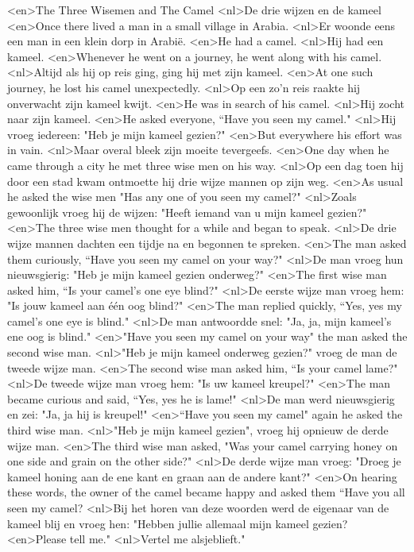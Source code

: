 <en>The Three Wisemen and The Camel
<nl>De drie wijzen en de kameel
<en>Once there lived a man in a small village in Arabia.
<nl>Er woonde eens een man in een klein dorp in Arabië.
<en>He had a camel.
<nl>Hij had een kameel.
<en>Whenever he went on a journey, he went along with his camel.
<nl>Altijd als hij op reis ging, ging hij met zijn kameel.
<en>At one such journey, he lost his camel unexpectedly.
<nl>Op een zo'n reis raakte hij onverwacht zijn kameel kwijt.
<en>He was in search of his camel.
<nl>Hij zocht naar zijn kameel.
<en>He asked everyone, “Have you seen my camel."
<nl>Hij vroeg iedereen: "Heb je mijn kameel gezien?"
<en>But everywhere his effort was in vain.
<nl>Maar overal bleek zijn moeite tevergeefs.
<en>One day when he came through a city he met three wise men on his way.
<nl>Op een dag toen hij door een stad kwam ontmoette hij drie wijze mannen op zijn weg.
<en>As usual he asked the wise men "Has any one of you seen my camel?"
<nl>Zoals gewoonlijk vroeg hij de wijzen: "Heeft iemand van u mijn kameel gezien?"
<en>The three wise men thought for a while and began to speak.
<nl>De drie wijze mannen dachten een tijdje na en begonnen te spreken.
<en>The man asked them curiously, “Have you seen my camel on your way?"
<nl>De man vroeg hun nieuwsgierig: "Heb je mijn kameel gezien onderweg?"
<en>The first wise man asked him, “Is your camel’s one eye blind?"
<nl>De eerste wijze man vroeg hem: "Is jouw kameel aan één oog blind?"
<en>The man replied quickly, “Yes, yes my camel's one eye is blind."
<nl>De man antwoordde snel: "Ja, ja, mijn kameel's ene oog is blind."
<en>"Have you seen my camel on your way" the man asked the second wise man.
<nl>"Heb je mijn kameel onderweg gezien?" vroeg de man de tweede wijze man.
<en>The second wise man asked him, “Is your camel lame?"
<nl>De tweede wijze man vroeg hem: "Is uw kameel kreupel?"
<en>The man became curious and said, “Yes, yes he is lame!"
<nl>De man werd nieuwsgierig en zei: "Ja, ja hij is kreupel!"
<en>“Have you seen my camel" again he asked the third wise man.
<nl>"Heb je mijn kameel gezien", vroeg hij opnieuw de derde wijze man.
<en>The third wise man asked, "Was your camel carrying honey on one side and grain on the other side?"
<nl>De derde wijze man vroeg: "Droeg je kameel honing aan de ene kant en graan aan de andere kant?"
<en>On hearing these words, the owner of the camel became happy and asked them “Have you all seen my camel?
<nl>Bij het horen van deze woorden werd de eigenaar van de kameel blij en vroeg hen: "Hebben jullie allemaal mijn kameel gezien?
<en>Please tell me."
<nl>Vertel me alsjeblieft."
